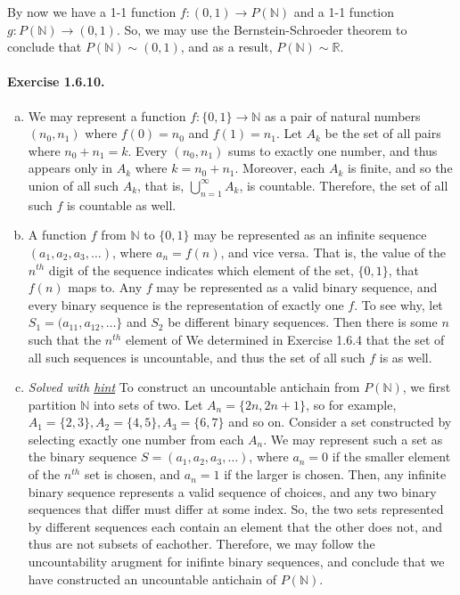\documentclass{article}
\newcommand{\N}{\mathbb{N}}
\newcommand{\R}{\mathbb{R}}
\begin{document}
By now we have a 1-1 function $f:(0,1)\to P(\N)$ and a 1-1 function $g:P(\N)\to (0,1)$. So, we may use the Bernstein-Schroeder theorem to conclude that $P(\N)\sim (0,1)$, and as a result, $P(\N)\sim\R$.

\paragraph{Exercise 1.6.10.}
\begin{enumerate}[(a)]
    \item
	We may represent a function $f: \{0,1\}\to \N$ as a pair of natural numbers $(n_0, n_1)$ where $f(0)=n_0$ and $f(1)=n_1$.
	Let $A_k$ be the set of all pairs where $n_0 + n_1 = k$.
	Every $(n_0, n_1)$ sums to exactly one number, and thus appears only in $A_{k}$ where $k=n_0 + n_1$.
	Moreover, each $A_k$ is finite, and so the union of all such $A_k$, that is, $\bigcup_{n=1}^\infty A_k$, is countable.
	Therefore, the set of all such $f$ is countable as well.

	\item 
	A function $f$ from $\N$ to $\{0,1\}$ may be represented as an infinite sequence $(a_1,a_2,a_3,\ldots)$, where $a_n = f(n)$, and vice versa.
	That is, the value of the $n^{th}$ digit of the sequence indicates which element of the set, $\{0,1\}$, that $f(n)$ maps to.
	Any $f$ may be represented as a valid binary sequence, and every binary sequence is the representation of exactly one $f$.
	To see why, let $S_1=(a_{11}, a_{12}, \ldots\}$ and $S_2$ be different binary sequences.
	Then there is some $n$ such that the $n^{th}$ element of 
	We determined in Exercise 1.6.4 that the set of all such sequences is uncountable, and thus the set of all such $f$ is as well.

	\item \textit{Solved with \href{https://math.stackexchange.com/a/4858163/1027565}{hint}}
	To construct an uncountable antichain from $P(\N)$, we first partition $\N$ into sets of two.
	Let $A_n = \{2n, 2n+1\}$, so for example, $A_1 = \{2,3\}, A_2 = \{4, 5\}, A_3 = \{6,7\}$ and so on.
	Consider a set constructed by selecting exactly one number from each $A_n$.
	We may represent such a set as the binary sequence $S=(a_1,a_2,a_3,\ldots)$, where $a_n = 0$ if the smaller element of the $n^{th}$ set is chosen, and $a_n=1$ if the larger is chosen.
	Then, any infinite binary sequence represents a valid sequence of choices, and any two binary sequences that differ must differ at some index.
	So, the two sets represented by different sequences each contain an element that the other does not, and thus are not subsets of eachother.
	Therefore, we may follow the uncountability arugment for inifinte binary sequences, and conclude that we have constructed an uncountable antichain of $P(\N)$.
\end{enumerate}
\end{document}
